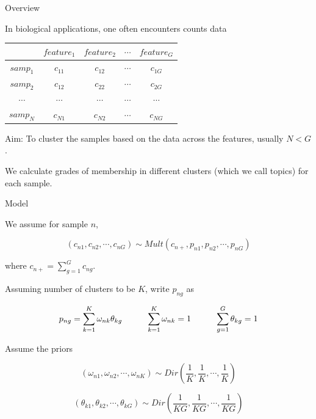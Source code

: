 \documentclass{beamer}\usepackage[]{graphicx}\usepackage[]{color}
\begin{document}
\begin{frame}[fragile]{Overview \;\;}

In biological applications, one often encounters counts data \newline

\begin{tabular}{|c|c|c|c|c|}
\hline
& $feature_1$ & $feature_2$ & $\cdots$ & $feature_G$ \\ \hline
$samp_1$ & $c_{11}$ & $c_{12}$ & $\cdots$ & $c_{1G}$ \\ \hline
$samp_2$ & $c_{12}$ & $c_{22}$ & $\cdots$ & $c_{2G}$ \\ \hline
$\cdots$  &  $\cdots$  &  $\cdots$ & $\cdots$ & $\cdots$  \\ \hline
$samp_N$ & $c_{N1}$ & $c_{N2}$ & $\cdots$ & $c_{NG}$  \\ \hline
\end{tabular} \pause \newline

Aim: To cluster the samples based on the data across the features, usually $N < G$. \pause \newline

We calculate grades of membership in different clusters (which we call topics) for each sample. \pause \newline

\end{frame}

\begin{frame}[fragile]{Model \;\;}

We assume for sample $n$,

$$ \left (c_{n1}, c_{n2}, \cdots, c_{nG} \right) \sim Mult \left ( c_{n+}, p_{n1}, p_{n2}, \cdots, p_{nG} \right) $$

where $ c_{n+} = \sum_{g=1}^{G} c_{ng}$.

Assuming number of clusters to be $K$, write $p_{ng}$ as 

$$ p_{ng} = \sum_{k=1}^{K} \omega_{nk} \theta_{kg} \hspace{1 cm} \sum_{k=1}^{K} \omega_{nk}=1 \hspace{1 cm} \sum_{g=1}^{G} \theta_{kg}=1 $$

Assume the priors

$$ (\omega_{n1}, \omega_{n2}, \cdots, \omega_{nK}) \sim Dir \left ( \frac{1}{K}, \frac{1}{K}, \cdots, \frac{1}{K} \right ) $$

$$ (\theta_{k1}, \theta_{k2}, \cdots, \theta_{kG}) \sim Dir \left ( \frac{1}{KG}, \frac{1}{KG}, \cdots, \frac{1}{KG} \right ) $$

\end{frame}
\end{document}
